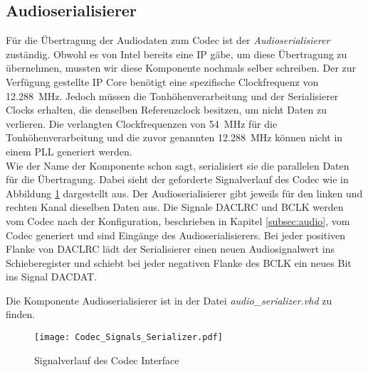 
\subsection{Audioserialisierer}\label{subsec:Audio_Serializer}

Für die Übertragung der Audiodaten zum Codec ist der \textit{Audioserialisierer} zuständig. Obwohl es von Intel bereits eine IP gäbe, um diese Übertragung zu übernehmen, mussten wir diese Komponente nochmals selber schreiben. Der zur Verfügung gestellte IP Core benötigt eine spezifische Clockfrequenz von \SI{12.288}{MHz}. Jedoch müssen die Tonhöhenverarbeitung und der Serialisierer Clocks erhalten, die denselben Referenzclock besitzen, um nicht Daten zu verlieren. Die verlangten Clockfrequenzen von \SI{54}{MHz} für die Tonhöhenverarbeitung und die zuvor genannten \SI{12.288}{MHz} können nicht in einem PLL generiert werden. \\
Wie der Name der Komponente schon sagt, serialisiert sie die parallelen Daten für die Übertragung. Dabei sieht der geforderte Signalverlauf des Codec wie in Abbildung \ref{img:Codec_Signals} dargestellt aus. Der Audioserialisierer gibt jeweils für den linken und rechten Kanal dieselben Daten aus. Die Signale DACLRC und BCLK werden vom Codec nach der Konfiguration, beschrieben in Kapitel \ref{subsec:audio}, vom Codec generiert und sind Eingänge des Audioserialisierers. Bei jeder positiven Flanke von DACLRC lädt der Serialisierer einen neuen Audiosignalwert ins Schieberegister und schiebt bei jeder negativen Flanke des BCLK ein neues Bit ins Signal DACDAT.

Die Komponente Audioserialisierer ist in der Datei \textit{audio\_serializer.vhd} zu finden.

\begin{figure}[t]
	\centering
	\texttt{[image: Codec\_Signals\_Serializer.pdf]}
	\caption{Signalverlauf des Codec Interface} 
	\label{img:Codec_Signals}
\end{figure}  